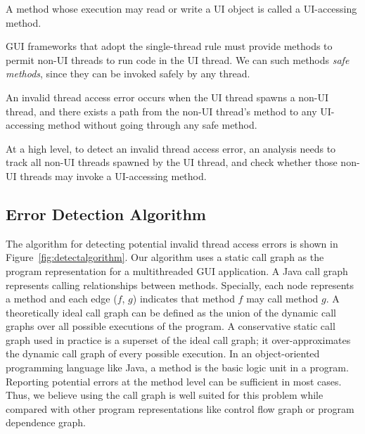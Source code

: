  { A method
whose execution may read or write a UI object is called a UI-accessing method.}\vspace{1mm}

 {GUI frameworks that
adopt the single-thread rule must provide methods to permit non-UI threads
to run code in the UI thread. We can such methods \textit{safe methods}, since
they can be invoked safely by any thread.}\vspace{1mm}

 {An invalid
thread access error occurs when the UI thread spawns a non-UI thread, and there
exists a path from the non-UI thread's  method to any UI-accessing method
without going through any safe method. }\vspace{2mm}

At a high level, to detect an invalid thread access error, an analysis needs to track all
non-UI threads spawned by the UI thread, and check whether those non-UI threads
may invoke a UI-accessing method.

\subsection{Error Detection Algorithm}

The algorithm for detecting potential invalid thread access errors
is shown in Figure~\ref{fig:detectalgorithm}. Our algorithm uses a
static call graph as the program representation for a multithreaded
GUI application. A Java call graph represents calling relationships
between methods. Specially, each node represents a method and each
edge ($f$, $g$) indicates that method $f$ may call method $g$.
A theoretically ideal call graph can be defined as the union of the
dynamic call graphs over all possible executions of the program. 
A conservative static call graph used in practice is a superset of
the ideal call graph; it over-approximates the
dynamic call graph of every possible execution. 
In an object-oriented programming language like
Java, a method is the basic logic unit in a program. Reporting
potential errors at the method level can be sufficient in most cases.
Thus, we believe using the call graph is well suited for this problem while
compared with other program representations like control flow graph or
program dependence graph. 


